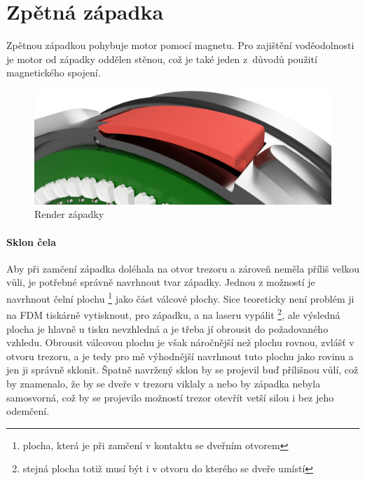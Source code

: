 \section{Zpětná západka}

Zpětnou západkou pohybuje motor pomocí magnetu. Pro zajištění voděodolnosti je motor od západky oddělen stěnou, což je také jeden z~důvodů použití magne\-tic\-ké\-ho spojení.

\begin{figure}[h]
    \centering
    \includegraphics[width=\textwidth]{kapitoly/obrazky/E4/zapadka/render.png}
    \caption{Render západky}

    \label{fig:E4-zapadka}
\end{figure}

\clearpage
\newpage

\paragraph{Sklon čela}

Aby při zamčení západka doléhala na otvor trezoru a zároveň neměla příliš velkou vůli, je potřebné správně navrhnout tvar západky.
Jednou z možností je navrhnout čelní plochu \footnote{plocha, která je při zamčení v kontaktu se dveřním otvorem} jako část válcové plochy.  %
Sice teoreticky není problém ji na FDM tiskárně vytisknout, pro západku, a na laseru vypálit \footnote{stejná plocha totiž musí být i v otvoru do kterého se dveře umístí},
ale výsledná plocha je hlavně u tisku nevzhledná a je třeba jí obrousit do požadovaného vzhledu. Obrousit válcovou plochu je však náročnější než plochu rovnou, zvlášť v otvoru trezoru, 
a je tedy pro mě výhodnější navrhnout tuto plochu jako rovinu a jen ji správně sklonit. Špatně navržený sklon by se projevil buď přílišnou vůlí, 
což by znamenalo, že by se dveře v trezoru viklaly a nebo by západka nebyla samosvorná, což by se projevilo možností trezor otevřít vetší silou 
i bez jeho odemčení.

